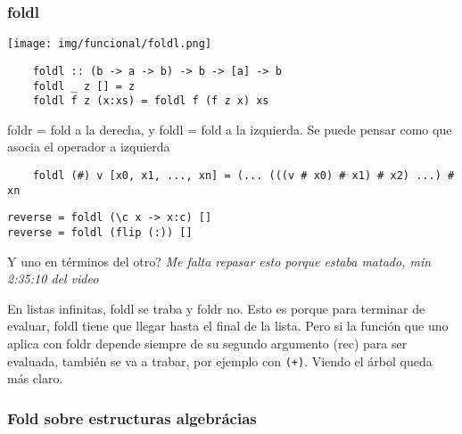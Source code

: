 \documentclass{report}
\theoremstyle{definition} %
\begin{document}
\subsubsection{foldl}

\begin{center}
    \texttt{[image: img/funcional/foldl.png]}
\end{center}

\begin{verbatim}
    foldl :: (b -> a -> b) -> b -> [a] -> b
    foldl _ z [] = z
    foldl f z (x:xs) = foldl f (f z x) xs
\end{verbatim}

foldr = fold a la derecha, y foldl = fold a la izquierda.
Se puede pensar como que asocia el operador a izquierda

\begin{verbatim}
    foldl (#) v [x0, x1, ..., xn] = (... (((v # x0) # x1) # x2) ...) # xn
\end{verbatim}


\begin{verbatim}
reverse = foldl (\c x -> x:c) []
reverse = foldl (flip (:)) []
\end{verbatim}

Y uno en términos del otro? \textit{Me falta repasar esto porque estaba matado,
min 2:35:10 del video}

En listas infinitas, foldl se traba y foldr no. Esto es porque para terminar de
evaluar, foldl tiene que llegar hasta el final de la lista. Pero si la función
que uno aplica con foldr depende siempre de su segundo argumento (rec) para ser
evaluada, también se va a trabar, por ejemplo con \texttt{(+)}. Viendo el árbol
queda más claro.

\subsubsection{Fold sobre estructuras algebrácias}
\end{document}
